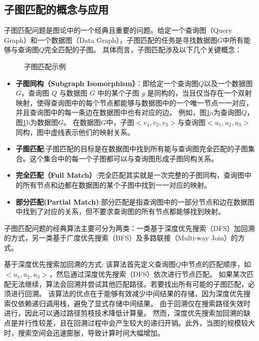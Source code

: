 \subsection{子图匹配的概念与应用}
子图匹配问题是图论中的一个经典且重要的问题。给定一个查询图（Query Graph）和一个数据图（Data Graph），子图匹配的任务是寻找数据图$G$中所有能够与查询图$Q$完全匹配的子图。
具体而言，子图匹配涉及以下几个关键概念：
\begin{figure}[h!]
    \centering
    \caption{子图匹配示例}
    \label{fig:example_subgraph_matching}
\end{figure}
\begin{itemize}
    \item \textbf{子图同构（Subgraph Isomorphism）}：即给定一个查询图$Q$以及一个数据图$G$，查询图 $Q$ 与数据图 $G$ 中的某个子图 $g$ 是同构的，当且仅当存在一个双射映射，使得查询图中的每个节点都能够与数据图中的一个唯一节点一一对应，并且查询图中的每一条边在数据图中也有对应的边。
    例如，图\ref{fig:example_subgraph_matching}a为查询图$Q$，图\ref{fig:example_subgraph_matching}b为数据图$G$。
    在数据图$G$中，子图$<v_1,v_2,v_3>$与查询图$<u_1,u_2,u_3>$同构，图中虚线表示他们的映射关系。
    \item \textbf{子图匹配}:子图匹配的目标是在数据图中找到所有能与查询图完全匹配的子图集合。这个集合中的每一个子图都可以与查询图形成子图同构关系。
    \item \textbf{完全匹配（Full Match）}:完全匹配其实就是一次完整的子图同构，查询图中的所有节点和边都在数据图的某个子图中找到一一对应的映射。
    \item \textbf{部分匹配(Partial Match)}:部分匹配是指查询图中的一部分节点和边在数据图中找到了对应的关系，但不要求查询图的所有节点都能够找到映射。
\end{itemize}


子图匹配问题的经典算法主要可分为两类：一类基于深度优先搜索（DFS）加回溯的方式\cite{sm-ullmann-DBLP:journals/jacm/Ullmann76}，另一类基于广度优先搜索（BFS）及多路联接（Multi-way Join）的方式\cite{sm-bfs-DBLP:conf/focs/AtseriasGM08}。

基于深度优先搜索加回溯的方式: 该算法首先定义查询图$Q$中节点的匹配顺序，如$<u_1, u_2, u_3>$，然后通过深度优先搜索（DFS）依次进行节点匹配。
如果某次匹配无法继续，算法会回溯并尝试其他匹配路径。若要找出所有可能的子图匹配，必须进行回溯。
该算法的优点在于能够有效减少中间结果的存储，因为深度优先搜索仅依赖递归调用栈，避免了显式存储中间结果。
由于回溯仅在搜索路径失效时进行，因此可以通过路径剪枝技术降低计算量。
然而，深度优先搜索加回溯的缺点是并行性较差，且在回溯过程中会产生较大的递归开销。此外，当图的规模较大时，搜索空间会迅速膨胀，导致计算时间大幅增加。

